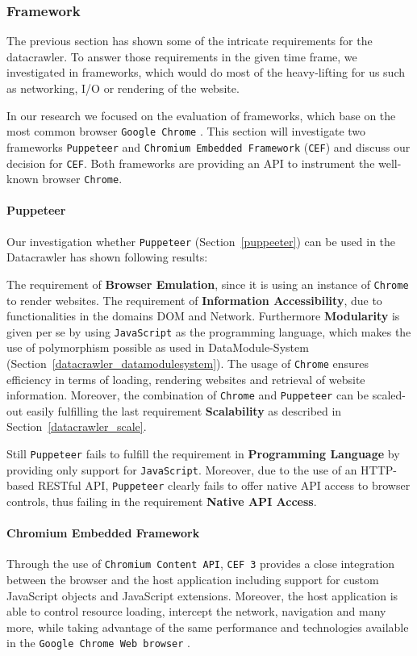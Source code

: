 \subsubsection{Framework}
\label{datacrawler_framework_language}
The previous section has shown some of the intricate requirements for the datacrawler. To answer those requirements in the given time frame, we investigated in frameworks, which would do most of the heavy-lifting for us such as networking, I/O or rendering of the website.

In our research we focused on the evaluation of frameworks, which base on the most common browser \texttt{Google Chrome} \cite{CommonBrowsers}. This section will investigate two frameworks \texttt{Puppeteer} and \texttt{Chromium Embedded Framework} (\texttt{CEF}) and discuss our decision for \texttt{CEF}. Both frameworks are providing an API to instrument the well-known browser \texttt{Chrome}.

\paragraph*{Puppeteer}
Our investigation whether \texttt{Puppeteer} (Section~\ref{puppeeter}) can be used in the Datacrawler has shown following results:

The requirement of \textbf{Browser Emulation}, since it is using an instance of \texttt{Chrome} to render websites. The requirement of \textbf{Information Accessibility}, due to functionalities in the domains DOM and Network. Furthermore \textbf{Modularity} is given per se by using \texttt{JavaScript} as the programming language, which makes the use of polymorphism possible as used in DataModule-System (Section~\ref{datacrawler_datamodulesystem}). The usage of \texttt{Chrome} ensures efficiency in terms of loading, rendering websites and retrieval of website information. Moreover, the combination of \texttt{Chrome} and \texttt{Puppeteer} can be scaled-out easily fulfilling the last requirement \textbf{Scalability} as described in Section~\ref{datacrawler_scale}.

Still \texttt{Puppeteer} fails to fulfill the requirement in \textbf{Programming Language } by providing only support for \texttt{JavaScript}. Moreover, due to the use of an HTTP-based RESTful API, \texttt{Puppeteer} clearly fails to offer native API access to browser controls, thus failing in the requirement \textbf{Native API Access}. 

\paragraph*{Chromium Embedded Framework}
Through the use of \texttt{Chromium Content API}, \texttt{CEF 3} provides a close integration between the browser and the host application including support for custom JavaScript objects and JavaScript extensions. Moreover, the host application is able to control resource loading, intercept the network, navigation and many more, while taking advantage of the same performance and technologies available in the \texttt{Google Chrome Web browser} \cite{CEFGeneralUsage}.

